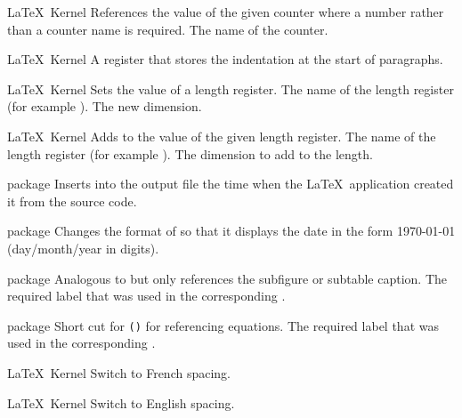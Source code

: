 %
 {}%
 {\LaTeX\ Kernel}%
 {References the value of the given counter where a number rather
   than a counter name is required.}%
 {%
   \BeginArgList
     The name of the counter.
   \EndArgList
 }

%
 {}%
 {\LaTeX\ Kernel}%
 {A  register that stores the indentation at the start of paragraphs.}%
 {}


%
 {}%
 {\LaTeX\ Kernel}%
 {Sets the value of a length register.}%
 {%
   \BeginArgList
      The name of the length register (for
       example ).
      The new dimension.
   \EndArgList
 }

%
 {}%
 {\LaTeX\ Kernel}%
 {Adds  to the value of the given length register.}%
 {%
   \BeginArgList
      The name of the length register (for
       example ).
      The dimension to add to the length.
   \EndArgList
 }

%
 {}%
 { package}%
 {Inserts into the output file the time when the \LaTeX\ 
  application created it from the source code.}%
 {}

%
 {}%
 { package}%
 {Changes the format of  so that it displays the date in
  the form {\ddmmyyyydate\today} (day\slash month\slash year in digits).}%
 {}

%
 {}%
 { package}%
 {Analogous to  but only references the subfigure
  or subtable caption.}%
 {%
   \BeginArgList
     The required label that was used in the
     corresponding \nxglsi{label}.
   \EndArgList
 }

%
 {}%
 { package}%
 {Short cut for \texttt{()} for
  referencing equations.}%
 {%
   \BeginArgList
     The required label that was used in the
     corresponding \nxglsi{label}.
   \EndArgList
 }

%
 {}%
 {\LaTeX\ Kernel}%
 {Switch to French spacing.}%
 {}

%
 {}%
 {\LaTeX\ Kernel}%
 {Switch to English spacing.}%
 {}


